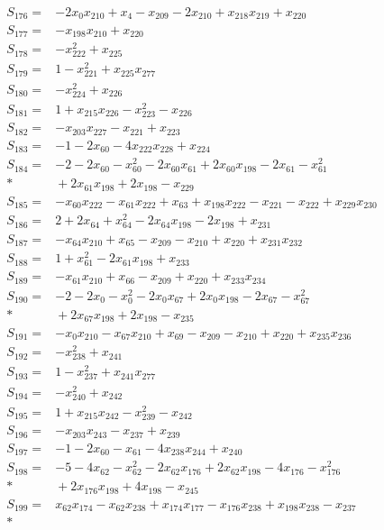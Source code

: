 \begin{align*}
S_{176}={}&-2x_{0}x_{210}+x_{4}-x_{209}-2x_{210}+x_{218}x_{219}+x_{220}\\[3pt]
S_{177}={}&-x_{198}x_{210}+x_{220}\\[3pt]
S_{178}={}&-x_{222}^{2}+x_{225}\\[3pt]
S_{179}={}&1-x_{221}^{2}+x_{225}x_{277}\\[3pt]
S_{180}={}&-x_{224}^{2}+x_{226}\\[3pt]
S_{181}={}&1+x_{215}x_{226}-x_{223}^{2}-x_{226}\\[3pt]
S_{182}={}&-x_{203}x_{227}-x_{221}+x_{223}\\[3pt]
S_{183}={}&-1-2x_{60}-4x_{222}x_{228}+x_{224}\\[3pt]
S_{184}={}&-2-2x_{60}-x_{60}^{2}-2x_{60}x_{61}+2x_{60}x_{198}-2x_{61}-x_{61}^{2}\\*
&{}+2x_{61}x_{198}+2x_{198}-x_{229}\\[3pt]
S_{185}={}&-x_{60}x_{222}-x_{61}x_{222}+x_{63}+x_{198}x_{222}-x_{221}-x_{222}+x_{229}x_{230}\\[3pt]
S_{186}={}&2+2x_{64}+x_{64}^{2}-2x_{64}x_{198}-2x_{198}+x_{231}\\[3pt]
S_{187}={}&-x_{64}x_{210}+x_{65}-x_{209}-x_{210}+x_{220}+x_{231}x_{232}\\[3pt]
S_{188}={}&1+x_{61}^{2}-2x_{61}x_{198}+x_{233}\\[3pt]
S_{189}={}&-x_{61}x_{210}+x_{66}-x_{209}+x_{220}+x_{233}x_{234}\\[3pt]
S_{190}={}&-2-2x_{0}-x_{0}^{2}-2x_{0}x_{67}+2x_{0}x_{198}-2x_{67}-x_{67}^{2}\\*
&{}+2x_{67}x_{198}+2x_{198}-x_{235}\\[3pt]
S_{191}={}&-x_{0}x_{210}-x_{67}x_{210}+x_{69}-x_{209}-x_{210}+x_{220}+x_{235}x_{236}\\[3pt]
S_{192}={}&-x_{238}^{2}+x_{241}\\[3pt]
S_{193}={}&1-x_{237}^{2}+x_{241}x_{277}\\[3pt]
S_{194}={}&-x_{240}^{2}+x_{242}\\[3pt]
S_{195}={}&1+x_{215}x_{242}-x_{239}^{2}-x_{242}\\[3pt]
S_{196}={}&-x_{203}x_{243}-x_{237}+x_{239}\\[3pt]
S_{197}={}&-1-2x_{60}-x_{61}-4x_{238}x_{244}+x_{240}\\[3pt]
S_{198}={}&-5-4x_{62}-x_{62}^{2}-2x_{62}x_{176}+2x_{62}x_{198}-4x_{176}-x_{176}^{2}\\*
&{}+2x_{176}x_{198}+4x_{198}-x_{245}\\[3pt]
S_{199}={}&x_{62}x_{174}-x_{62}x_{238}+x_{174}x_{177}-x_{176}x_{238}+x_{198}x_{238}-x_{237}\\*

\end{align*}
